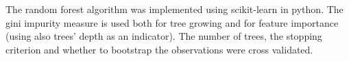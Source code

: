  The random forest algorithm was implemented using scikit-learn in python. The gini impurity measure is used both for tree growing and for feature importance (using also trees' depth as an indicator). The number of trees, the stopping criterion and whether to bootstrap the observations were cross validated. 
%
%
%
